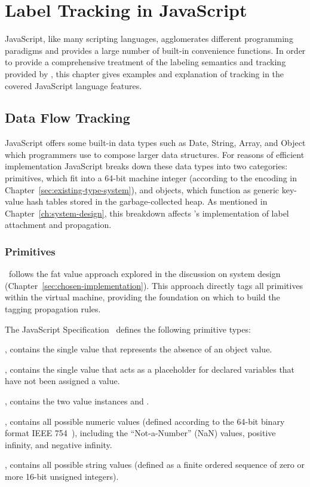 
\chapter{Label Tracking in JavaScript}

JavaScript, like many scripting languages, agglomerates different programming paradigms and provides a large number of built-in convenience functions.
In order to provide a comprehensive treatment of the labeling semantics and tracking provided by \FlowCore, this chapter gives examples and explanation of tracking in the covered JavaScript language features.

\section{Data Flow Tracking}
\label{sec:data-flow-tracking}

JavaScript offers some built-in data types such as Date, String, Array, and Object which programmers use to compose larger data structures.
For reasons of efficient implementation JavaScript breaks down these data types into two categories: primitives, which fit into a 64-bit machine integer (according to the encoding in Chapter~\ref{sec:existing-type-system}), and objects, which function as generic key-value hash tables stored in the garbage-collected heap.
As mentioned in Chapter~\ref{ch:system-design}, this breakdown affects \FlowCore's implementation of label attachment and propagation.

\subsection{Primitives}

\FlowCore\ follows the fat value approach explored in the discussion on system design (Chapter~\ref{sec:chosen-implementation}).
This approach directly tags all primitives within the virtual machine, providing the foundation on which to build the tagging propagation rules.

The JavaScript Specification~\cite{ecma} defines the following primitive types:
\begin{description}
  \item \textbf{}, contains the single value  that represents the absence of an object value.
  \item \textbf{}, contains the single value  that acts as a placeholder for declared variables that have not been assigned a value.
  \item \textbf{}, contains the two value instances  and .
  \item \textbf{}, contains all possible numeric values (defined according to the 64-bit binary format IEEE 754~\cite{ieee754}), including the ``Not-a-Number'' (NaN) values, positive infinity, and negative infinity.
  \item \textbf{}, contains all possible string values (defined as a finite ordered sequence of zero or more 16-bit unsigned integers).
\end{description}

